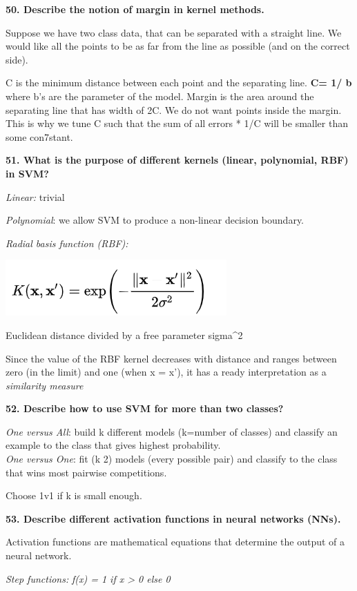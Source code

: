 \textbf{50. Describe the notion of margin in kernel methods.}

Suppose we have two class data, that can be separated with a straight
line. We would like all the points to be as far from the line as
possible (and on the correct side).

C is the minimum distance between each point and the separating line.
\textbf{C= 1/ \textbar b\textbar{}} where b's are the parameter of the
model. Margin is the area around the separating line that has width of
2C. We do not want points inside the margin. This is why we tune C such
that the sum of all errors * 1/C will be smaller than some con7stant.

\textbf{51. What is the purpose of different kernels (linear,
polynomial, RBF) in SVM?}

\textit{Linear:} trivial

\textit{Polynomial}: we allow SVM to produce a non-linear decision
boundary.

\textit{Radial basis function (RBF):}

\includegraphics[width=3.33333in,height=0.84375in]{media/image30.png}

Euclidean distance divided by a free parameter sigma\^{}2

Since the value of the RBF kernel decreases with distance and ranges
between zero (in the limit) and one (when x = x'), it has a ready
interpretation as a \emph{similarity measure}

\textbf{52. Describe how to use SVM for more than two classes?}

\textit{One versus All}: build k different models (k=number of
classes) and classify an example to the class that gives highest
probability.\\
\textit{One versus One}: fit (k 2) models (every possible pair) and
classify to the class that wins most pairwise competitions.

Choose 1v1 if k is small enough.

\textbf{53. Describe different activation functions in neural networks
(NNs).}

Activation functions are mathematical equations that determine the
output of a neural network.

\textit{Step functions:} \emph{f(x) = 1 if x \textgreater{} 0 else 0}

